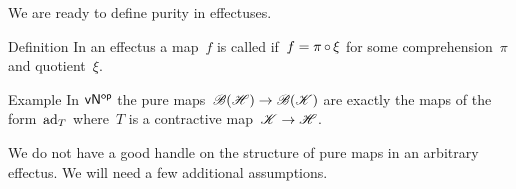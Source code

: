 \documentclass[b]{subfiles}
\begin{document}
\begin{parsec}%
\begin{point}%
We are ready to define purity in effectuses.
\end{point}
\begin{point}{Definition}%
In an effectus a map~$f$ is called 
    if~$f = \pi \mathop{\circ} \xi$
    for some comprehension~$\pi$
    and quotient~$\xi$.
\end{point}
\begin{point}{Example}%
In ${\mathsf{vN}}{^{\mathsf{op}}}$
the pure maps~$\mathscr{B}(\mathscr{H}) \to \mathscr{B}(\mathscr{K})$
    are exactly the maps of the form~$\mathrm{ad}_T$
    where~$T$ is a contractive map~$\mathscr{K} \to \mathscr{H}$. 
\end{point}
\begin{point}%
We do not have a good handle on the structure of pure maps in
    an arbitrary effectus.  We will need a few additional assumptions.
\end{point}
\end{parsec}
\end{document}
